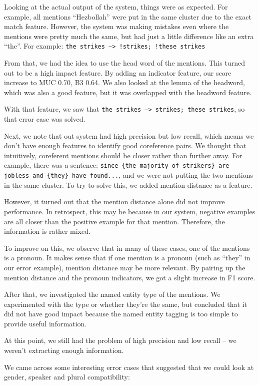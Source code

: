 \documentclass[12pt, twocolumn]{article}
\begin{document}
Looking at the actual output of the system, things were as expected. For example, all mentions ``Hezbollah'' were put in the same cluster due to the exact match feature. However, the system was making mistakes even where the mentions were pretty much the same, but had just a little difference like an extra ``the''. For example: \texttt{{the strikes} -->  !{strikes}; !{these strikes}}

From that, we had the idea to use the head word of the mentions. This turned out to be a high impact feature. By adding an indicator feature, our score increase to MUC 0.70, B3 0.64. We also looked at the lemma of the headword, which was also a good feature, but it was overlapped with the headword feature.

With that feature, we saw that \texttt{{the strikes} -->  {strikes}; {these strikes}}, so that error case was solved. 

Next, we note that out system had high precision but low recall, which means we don't have enough features to identify good coreference pairs. We thought that intuitively, coreferent mentions should be closer rather than further away. For example, there was a sentence: \texttt{since \{{the majority of strikers\}} are jobless and {\{they\}} have found...}, and we were not putting the two mentions in the same cluster. To try to solve this, we added mention distance as a feature.

However, it turned out that the mention distance alone did not improve performance. In retrospect, this may be because in our system, negative examples are all closer than the positive example for that mention. Therefore, the information is rather mixed.

To improve on this, we observe that in many of these cases, one of the mentions is a pronoun. It makes sense that if one mention is a pronoun (such as ``they'' in our error example), mention distance may be more relevant. By pairing up the mention distance and the pronoun indicators, we got a slight increase in F1 score.

After that, we investigated the named entity type of the mentions. We experimented with the type or whether they're the same, but concluded that it did not have good impact because the named entity tagging is too simple to provide useful information.

At this point, we still had the problem of high precision and low recall -- we weren't extracting enough information.

We came across some interesting error cases that suggested that we could look at gender, speaker and plural compatibility:
\end{document}
